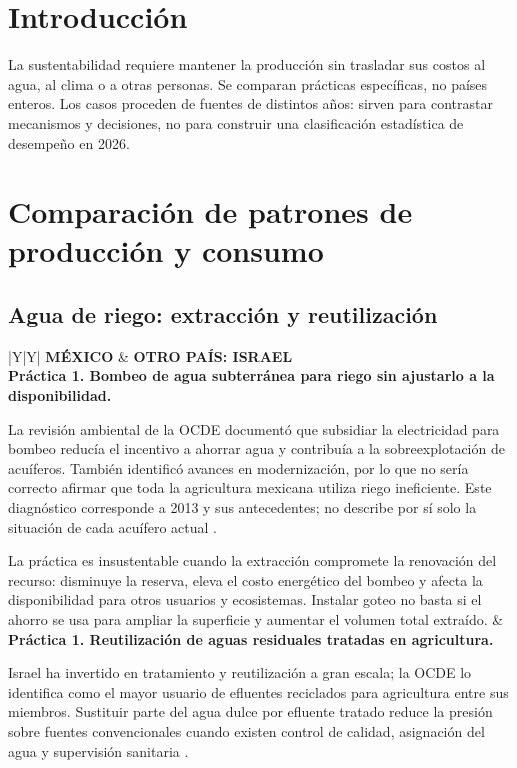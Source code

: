 \begin{landscape}
\section{Introducción}
La sustentabilidad requiere mantener la producción sin trasladar sus costos al agua, al clima o a otras personas. Se comparan prácticas específicas, no países enteros. Los casos proceden de fuentes de distintos años: sirven para contrastar mecanismos y decisiones, no para construir una clasificación estadística de desempeño en 2026.

\section{Comparación de patrones de producción y consumo}
\subsection{Agua de riego: extracción y reutilización}
\begin{tabularx}{\linewidth}{|Y|Y|}
\hline
{}\textbf{MÉXICO} & \textbf{OTRO PAÍS: ISRAEL}\\
\hline
\textbf{Práctica 1. Bombeo de agua subterránea para riego sin ajustarlo a la disponibilidad.}
\par La revisión ambiental de la OCDE documentó que subsidiar la electricidad para bombeo reducía el incentivo a ahorrar agua y contribuía a la sobreexplotación de acuíferos. También identificó avances en modernización, por lo que no sería correcto afirmar que toda la agricultura mexicana utiliza riego ineficiente. Este diagnóstico corresponde a 2013 y sus antecedentes; no describe por sí solo la situación de cada acuífero actual \parencite[pp. 28, 71]{ocdeMexico2013}.
\par La práctica es insustentable cuando la extracción compromete la renovación del recurso: disminuye la reserva, eleva el costo energético del bombeo y afecta la disponibilidad para otros usuarios y ecosistemas. Instalar goteo no basta si el ahorro se usa para ampliar la superficie y aumentar el volumen total extraído.
&
\textbf{Práctica 1. Reutilización de aguas residuales tratadas en agricultura.}
\par Israel ha invertido en tratamiento y reutilización a gran escala; la OCDE lo identifica como el mayor usuario de efluentes reciclados para agricultura entre sus miembros. Sustituir parte del agua dulce por efluente tratado reduce la presión sobre fuentes convencionales cuando existen control de calidad, asignación del agua y supervisión sanitaria \parencite{ocdeIsrael2023}.

\end{tabularx}
\end{landscape}
